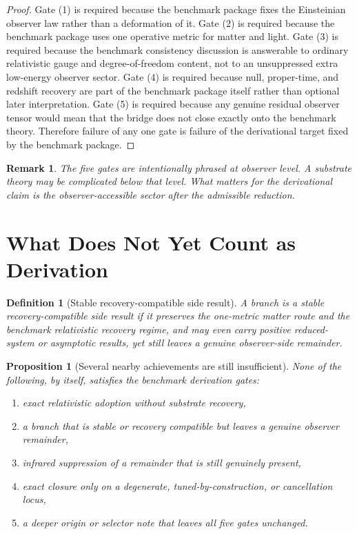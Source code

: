 \documentclass[11pt]{article}
\newtheorem{definition}{Definition}
\newtheorem{proposition}{Proposition}
\newtheorem{remark}{Remark}
\begin{document}
\begin{proof}
Gate (1) is required because the benchmark package fixes the Einsteinian observer law rather than a deformation of it. Gate (2) is required because the benchmark package uses one operative metric for matter and light. Gate (3) is required because the benchmark consistency discussion is answerable to ordinary relativistic gauge and degree-of-freedom content, not to an unsuppressed extra low-energy observer sector. Gate (4) is required because null, proper-time, and redshift recovery are part of the benchmark package itself rather than optional later interpretation. Gate (5) is required because any genuine residual observer tensor would mean that the bridge does not close exactly onto the benchmark theory. Therefore failure of any one gate is failure of the derivational target fixed by the benchmark package.
\end{proof}

\begin{remark}
The five gates are intentionally phrased at observer level. A substrate theory may be complicated below that level. What matters for the derivational claim is the observer-accessible sector after the admissible reduction.
\end{remark}

\section{What Does Not Yet Count as Derivation}

\begin{definition}[Stable recovery-compatible side result]
A branch is a \emph{stable recovery-compatible side result} if it preserves the one-metric matter route and the benchmark relativistic recovery regime, and may even carry positive reduced-system or asymptotic results, yet still leaves a genuine observer-side remainder.
\end{definition}

\begin{proposition}[Several nearby achievements are still insufficient]
None of the following, by itself, satisfies the benchmark derivation gates:
\begin{enumerate}
    \item exact relativistic adoption without substrate recovery,
    \item a branch that is stable or recovery compatible but leaves a genuine observer remainder,
    \item infrared suppression of a remainder that is still genuinely present,
    \item exact closure only on a degenerate, tuned-by-construction, or cancellation locus,
    \item a deeper origin or selector note that leaves all five gates unchanged.
\end{enumerate}
\end{proposition}
\end{document}
